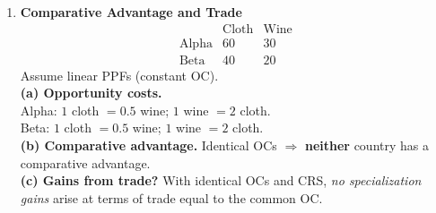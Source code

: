 \documentclass[12pt]{article}
\begin{document}
\begin{enumerate}[resume]
\textbf{(b) Opportunity cost from B to C.} Moving \(B\to C\): Wheat increases by \(+200\), Cars decrease by \(-20\).
\[
\text{OC of } +200 \text{ wheat} = 20 \text{ cars}\quad \Rightarrow \quad 0.10 \text{ car per ton of wheat.}
\]
Equivalently, \(1\) car costs \(10\) tons of wheat at this margin. \\
\textbf{(c) Is OC increasing?} Along each segment:
\[
\begin{aligned}
A\to B:&\ 0.05 \ \text{car/ton}\quad
B\to C:&\ 0.10 \ \text{car/ton}\quad
C\to D:&\ 0.15 \ \text{car/ton}\quad
D\to E:&\ 0.20 \ \text{car/ton}
\end{aligned}
\]
Opportunity cost rises monotonically as wheat output expands: \textbf{increasing} OC.


\newpage
\item \textbf{Comparative Advantage and Trade} \\

\[
\begin{array}{c|cc}
 & \text{Cloth} & \text{Wine}\\\hline
\text{Alpha} & 60 & 30\\
\text{Beta} & 40 & 20
\end{array}
\]
Assume linear PPFs (constant OC). \\
\textbf{(a) Opportunity costs.} \\
Alpha: \(1\) cloth \(=0.5\) wine; \(1\) wine \(=2\) cloth.\\
Beta: \(1\) cloth \(=0.5\) wine; \(1\) wine \(=2\) cloth. \\
\textbf{(b) Comparative advantage.} Identical OCs $\Rightarrow$ \textbf{neither} country has a comparative advantage. \\
\textbf{(c) Gains from trade?} With identical OCs and CRS, \emph{no specialization gains} arise at terms of trade equal to the common OC. 


\end{enumerate}
\end{document}
